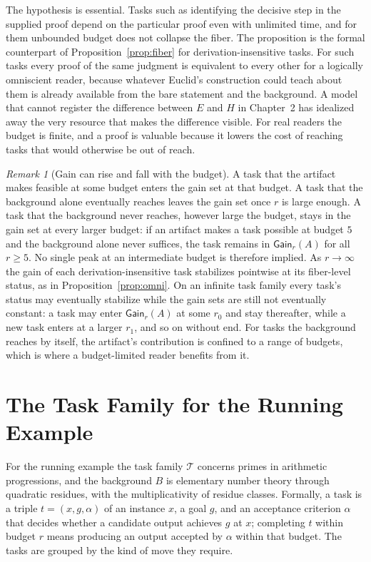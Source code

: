 \documentclass[11pt]{book}
\theoremstyle{definition}
\theoremstyle{remark}
\newtheorem{remark}[theorem]{Remark}
\newcommand{\Gain}{\mathsf{Gain}}
\begin{document}
The hypothesis is essential. Tasks such as identifying the decisive step in the supplied proof depend on the particular proof even with unlimited time, and for them unbounded budget does not collapse the fiber. The proposition is the formal counterpart of Proposition~\ref{prop:fiber} for derivation-insensitive tasks. For such tasks every proof of the same judgment is equivalent to every other for a logically omniscient reader, because whatever Euclid's construction could teach about them is already available from the bare statement and the background. A model that cannot register the difference between $E$ and $H$ in Chapter~2 has idealized away the very resource that makes the difference visible. For real readers the budget is finite, and a proof is valuable because it lowers the cost of reaching tasks that would otherwise be out of reach.

\begin{remark}[Gain can rise and fall with the budget]
A task that the artifact makes feasible at some budget enters the gain set at that budget. A task that the background alone eventually reaches leaves the gain set once $r$ is large enough. A task that the background never reaches, however large the budget, stays in the gain set at every larger budget: if an artifact makes a task possible at budget $5$ and the background alone never suffices, the task remains in $\Gain_r(A)$ for all $r\ge5$. No single peak at an intermediate budget is therefore implied. As $r\to\infty$ the gain of each derivation-insensitive task stabilizes pointwise at its fiber-level status, as in Proposition~\ref{prop:omni}. On an infinite task family every task's status may eventually stabilize while the gain sets are still not eventually constant: a task may enter $\Gain_r(A)$ at some $r_0$ and stay thereafter, while a new task enters at a larger $r_1$, and so on without end. For tasks the background reaches by itself, the artifact's contribution is confined to a range of budgets, which is where a budget-limited reader benefits from it.
\end{remark}

\section{The Task Family for the Running Example}

For the running example the task family $\mathcal T$ concerns primes in arithmetic progressions, and the background $B$ is elementary number theory through quadratic residues, with the multiplicativity of residue classes. Formally, a task is a triple $t=(x,g,\alpha)$ of an instance $x$, a goal $g$, and an acceptance criterion $\alpha$ that decides whether a candidate output achieves $g$ at $x$; completing $t$ within budget $r$ means producing an output accepted by $\alpha$ within that budget. The tasks are grouped by the kind of move they require.
\end{document}
